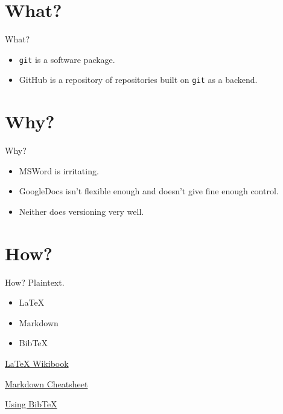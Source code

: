 \begin{frame}

\end{frame}

\section{What?}\label{what}

\begin{frame}{What?}

\begin{itemize}
\itemsep1pt\parskip0pt
\item
  \texttt{git} is a software package.
\item
  GitHub is a repository of repositories built on \texttt{git} as a
  backend.
\end{itemize}

\end{frame}

\section{Why?}\label{why}

\begin{frame}{Why?}

\begin{itemize}
\itemsep1pt\parskip0pt
\item
  MSWord is irritating.
\item
  GoogleDocs isn't flexible enough and doesn't give fine enough control.
\item
  Neither does versioning very well.
\end{itemize}

\end{frame}

\section{How?}\label{how}

\begin{frame}{How? Plaintext.}

\begin{itemize}
\itemsep1pt\parskip0pt
\item
  LaTeX
\item
  Markdown
\item
  BibTeX
\end{itemize}

\href{http://en.wikibooks.org/wiki/LaTeX}{LaTeX Wikibook}

\href{https://github.com/adam-p/markdown-here/wiki/Markdown-Cheatsheet}{Markdown
Cheatsheet}

\href{http://www.bibtex.org/Using/}{Using BibTeX}

\end{frame}

